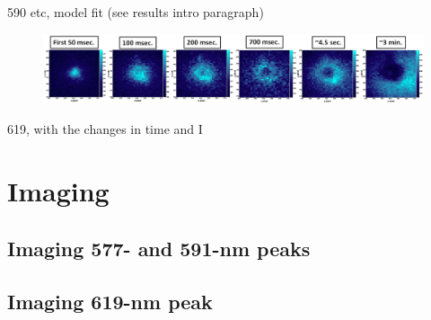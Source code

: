 590 etc, model fit (see results intro paragraph)

\begin{figure}[H]
        \centering
                \includegraphics[width=.9\textwidth]{figures/hole_bleach_590.png}
                \caption{}
\label{fig:testfig}
\end{figure}

619, with the changes in time and I

\section{Imaging}

\subsection{Imaging 577- and 591-nm peaks}

\subsection{Imaging 619-nm peak}